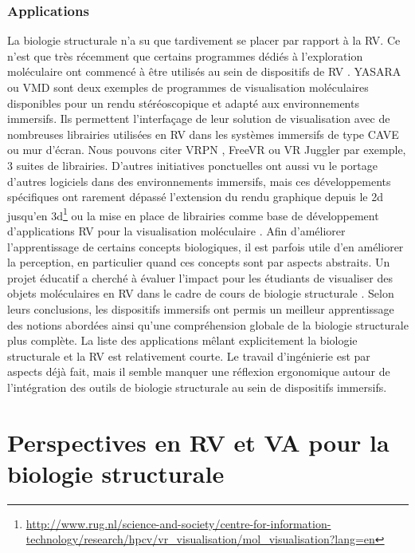 \subsubsection{Applications}

La biologie structurale n'a su que tardivement se placer par rapport à la RV. Ce n'est que très récemment que certains programmes dédiés à l'exploration moléculaire ont commencé à être utilisés au sein de dispositifs de RV \cite{odonoghue_visualization_2010}. YASARA \cite{krieger2014yasara} ou VMD \cite{stone_immersive_2010} sont deux exemples de programmes de visualisation moléculaires disponibles pour un rendu stéréoscopique et adapté aux environnements immersifs. Ils permettent l'interfaçage de leur solution de visualisation avec de nombreuses librairies utilisées en RV dans les systèmes immersifs de type CAVE ou mur d'écran. Nous pouvons citer VRPN \cite{taylor2001vrpn}, FreeVR \cite{pape2004commodity} ou VR Juggler par exemple, 3 suites de librairies. 
D'autres initiatives ponctuelles ont aussi vu le portage d'autres logiciels dans des environnements immersifs, mais ces développements spécifiques ont rarement dépassé l'extension du rendu graphique depuis le 2d jusqu'en 3d\footnote{\url{http://www.rug.nl/science-and-society/centre-for-information-technology/research/hpcv/vr\_visualisation/mol\_visualisation?lang=en}} ou la mise en place de librairies comme base de développement d'applications RV pour la visualisation moléculaire \cite{salvadori_moka:_2014}.  Afin d'améliorer l'apprentissage de certains concepts biologiques, il est parfois utile d'en améliorer la perception, en particulier quand ces concepts sont par aspects abstraits. Un projet éducatif a cherché à évaluer l'impact pour les étudiants de visualiser des objets moléculaires en RV dans le cadre de cours de biologie structurale \cite{tan_use_2013}. Selon leurs conclusions, les dispositifs immersifs ont permis un meilleur apprentissage des notions abordées ainsi qu'une compréhension globale de la biologie structurale plus complète.
La liste des applications mêlant explicitement la biologie structurale et la RV est relativement courte. Le travail d'ingénierie est par aspects déjà fait, mais il semble manquer une réflexion ergonomique autour de l'intégration des outils de biologie structurale au sein de dispositifs immersifs.


\section{Perspectives en RV et VA pour la biologie structurale} %
\label{sec:perspectives}


